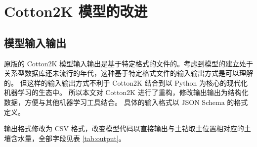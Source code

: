 \chapter{Cotton2K 模型的改进}\label{chap:modelModification}

\section{模型输入输出}\label{sec:io}

原版的 Cotton2K 模型输入输出是基于特定格式的文件的。考虑到模型的建立处于关系型数据库还未流行的年代，这种基于特定格式文件的输入输出方式是可以理解的。
但这样的输入输出方式不利于 Cotton2K 结合到以 Python 为核心的现代化机器学习的生态中。
所以本文对 Cotton2K 进行了重构，修改输出输出为结构化数据，方便与其他机器学习工具结合。
具体的输入格式以 JSON Schema 的格式定义。

输出格式修改为 CSV 格式，改变模型代码以直接输出与土钻取土位置相对应的土壤含水量，全部字段见表 \ref{tab:output}。

